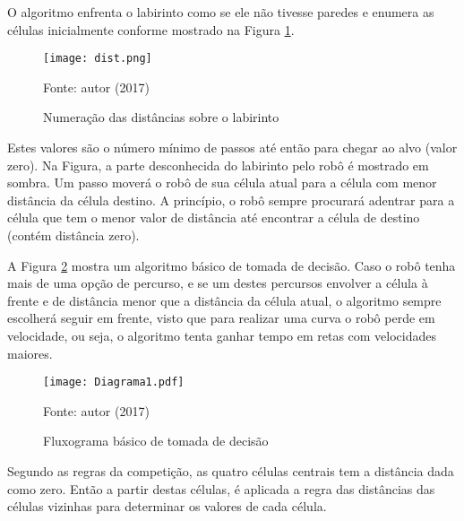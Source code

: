 O algoritmo enfrenta o labirinto como se ele não tivesse paredes e enumera as células inicialmente conforme mostrado na Figura \ref{fig:dist}. 


\begin{figure}[!htb]
	\caption{\label{fig:dist}Numeração das distâncias sobre o labirinto}
	\begin{center}
		\texttt{[image: dist.png]}
	\end{center}
	\centering
	\small Fonte: autor (2017)
\end{figure}

Estes valores são o número mínimo de passos até então para chegar ao alvo (valor zero). Na Figura, a parte desconhecida do labirinto pelo robô é mostrado em sombra. Um passo moverá o robô de sua célula atual para a célula com menor distância da célula destino. A princípio, o robô sempre procurará adentrar para a célula que tem o menor valor de distância até encontrar a célula de destino (contém distância zero).



A Figura \ref{fig:diagram1} mostra um algoritmo básico de tomada de decisão. Caso o robô tenha mais de uma opção de percurso, e se um destes percursos envolver a célula à frente e de distância menor que a distância da célula atual, o algoritmo sempre escolherá seguir em frente, visto que para realizar uma curva o robô perde em velocidade, ou seja, o algoritmo tenta ganhar tempo em retas com velocidades maiores. 


\begin{figure}[!htb]
	\caption{\label{fig:diagram1}Fluxograma básico de tomada de decisão}
	\begin{center}
		\texttt{[image: Diagrama1.pdf]}
	\end{center}
	\centering
	\small Fonte: autor (2017)
\end{figure}


Segundo as regras da competição, as quatro células centrais tem a distância dada como zero. Então a partir destas células, é aplicada a regra das distâncias das células vizinhas para determinar os valores de cada célula.


